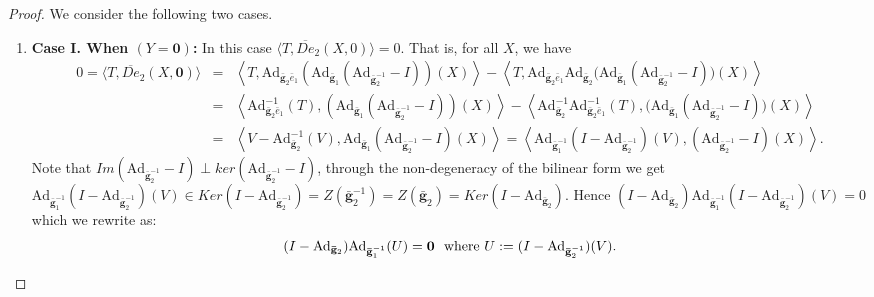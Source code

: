 \documentclass[10pt,twoside]{amsart}
\theoremstyle{definition}
\theoremstyle{definition}
\begin{document}
\begin{proof}
We consider the following two cases.
\begin{enumerate}
\item \textbf{Case I. When $(Y=\mathbf{0})$:} In this case $\langle T, \overline{De}_2(X, 0) \rangle = 0$. That is, for all $X$, we have
\begin{eqnarray*}
0=\langle T, \overline{De}_2(X,\mathbf{0}) \rangle &=& \left\langle T,\mathrm{Ad}_{\mathbf{\bar g}_2 \bar e_1}\left(\mathrm{Ad}_{\mathbf{\bar g}_1}(\mathrm{Ad}_{\mathbf{\bar g}_2^{-1}}-I)\right)(X)\right\rangle - \left\langle T, \mathrm{Ad}_{\mathbf{\bar g}_2 \bar e_1}\mathrm{Ad}_{\mathbf{\bar g}_2}\Big(\mathrm{Ad}_{\mathbf{\bar g}_1}(\mathrm{Ad}_{\mathbf{\bar g}_2^{-1}}-I)\Big)(X)\right\rangle\\
&=& \left\langle \mathrm{Ad}_{\mathbf{\bar g}_2 \bar e_1}^{-1} (T),\left(\mathrm{Ad}_{\mathbf{\bar g}_1}(\mathrm{Ad}_{\mathbf{\bar g}_2^{-1}}-I)\right)(X)\right\rangle - \left\langle  \mathrm{Ad}_{\mathbf{\bar g}_2}^{-1}\mathrm{Ad}_{\mathbf{\bar g}_2 \bar e_1}^{-1} (T),\Big(\mathrm{Ad}_{\mathbf{\bar g}_1}(\mathrm{Ad}_{\mathbf{\bar g}_2^{-1}}-I)\Big)(X)\right\rangle\\
&=& \left\langle V -  \mathrm{Ad}_{\mathbf{\bar g}_2}^{-1}(V), \mathrm{Ad}_{\mathbf{\bar g}_1}(\mathrm{Ad}_{\mathbf{\bar g}_2^{-1}}-I)(X)\right\rangle =  \left\langle \mathrm{Ad}_{\mathbf{\bar g}_1^{-1}}(I- \mathrm{Ad}_{\mathbf{\bar g}_2^{-1}})(V), (\mathrm{Ad}_{\mathbf{\bar g}_2^{-1}}-I)(X)\right\rangle.
\end{eqnarray*} 
Note that $Im(\mathrm{Ad}_{\mathbf{\bar g}_2^{-1}}-I)\perp ker(\mathrm{Ad}_{\mathbf{\bar g}_2^{-1}}-I)$, through the non-degeneracy of the bilinear form we get $\mathrm{Ad}_{\mathbf{\bar g}_1^{-1}}(I- \mathrm{Ad}_{\mathbf{\bar g}_2^{-1}})(V)\in Ker (I - \mathrm{Ad}_{\mathbf{\bar g}_2^{-1}}) = Z(\mathbf{\bar g}_2^{-1}) = Z(\mathbf{\bar g}_2)= Ker (I - \mathrm{Ad}_{\mathbf{\bar g}_2})$. Hence  $(I - \mathrm{Ad}_{\mathbf{\bar g}_2})\mathrm{Ad}_{\mathbf{\bar g}_1^{-1}}(I- \mathrm{Ad}_{\mathbf{\bar g}_2^{-1}})(V) =0$ which we rewrite as:
\begin{equation}{\label{ortho1}}
(I-\mathrm{Ad}_{\mathbf{\bar g}_2})\mathrm{Ad}_{\mathbf{\bar g}_1^{-1}}(U)=\mathbf{0} \ \ \text{where}\  U:=(I-\mathrm{Ad}_{\mathbf{\bar g}_2^{-1}})(V).  
\end{equation}


\end{enumerate}
\end{proof}
\end{document}
